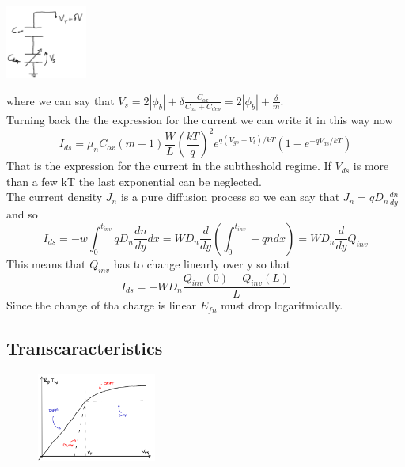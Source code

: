 \centering
\includegraphics[width=0.2\textwidth]{subth2.png}\\
\raggedright

where we can say that $V_s=2|\phi_b|+\delta \frac{C_{ox}}{C_{ox}+C_{dep}}=2|\phi_b|+\frac{\delta}{m}$.\\
Turning back the the expression for the current we can write it in this way now
\begin{equation}
I_{ds}=\mu_nC_{ox}(m-1)\frac{W}{L}(\frac{kT}{q})^2 e^{q(V_{gs}-V_t)/kT}\left(1-e^{-qV_{ds}/kT}\right)
\end{equation}
That is the expression for the current in the subtheshold regime. If $V_{ds}$ is more than a few kT the last exponential can be neglected.\\
The current density $J_n$ is a pure diffusion process so we can say that $J_n=qD_n \frac{dn}{dy}$ and so
\begin{equation}
I_{ds}=-w\int^{t_{inv}}_0qD_n \frac{dn}{dy}dx=WD_n \frac{d}{dy}\left(\int^{t_{inv}}_0 -qndx\right)=WD_n \frac{d}{dy}Q_{inv}
\end{equation}
This means that $Q_{inv}$ has to change linearly over y so that 
\begin{equation}
I_{ds}=-WD_n \frac{Q_{inv}(0)-Q_{inv}(L)}{L}
\end{equation}
Since the change of tha charge is linear $E_{fn}$ must drop logaritmically.\\

\subsection{Transcaracteristics}
\begin{figure}
\includegraphics[width=0.35\textwidth]{tranclog.png}
\end{figure}


